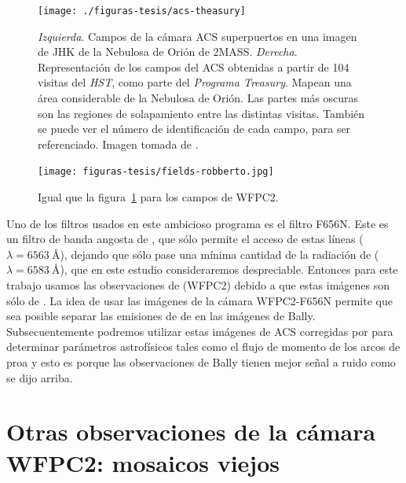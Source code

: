 \begin{figure}
\centering
  \texttt{[image: ./figuras-tesis/acs-theasury]}
\caption{\textit{Izquierda}. Campos de la cámara ACS superpuertos en una imagen de JHK de la Nebulosa de Orión de 2MASS. \textit{Derecha}. Representación de los campos del ACS obtenidas a partir de 104 visitas del \textit{HST}, como parte del \textit{Programa Treasury}. Mapean una área considerable de la Nebulosa de Orión. Las partes más oscuras son las regiones de solapamiento entre las distintas visitas. También se puede ver el número de identificación de cada campo, para ser referenciado. Imagen tomada de \citet{Robberto:2013a}. }\label{fig:field-acs-the}
\end{figure}

\begin{figure}
  \centering
  \texttt{[image: figuras-tesis/fields-robberto.jpg]}
  \caption{Igual que la figura~\ref{fig:field-acs-the} para los campos de WFPC2.}
  \label{fig:fields-robberto}
\end{figure}

Uno de los filtros usados en este ambicioso programa es el filtro F656N. Este es un filtro de banda angosta de \ha{}, que sólo permite el acceso de estas líneas (\ha{}~\(\lambda = 6563~\text{\AA{}}\)), dejando que sólo pase una mínima cantidad de la radiación de \nii{} (\(\lambda = 6583~\text{\AA{}}\)), que en este estudio consideraremos despreciable. Entonces para este trabajo usamos las observaciones de \citet{Robberto:2013a} (WFPC2) debido a que estas imágenes son sólo de \ha{}. La idea de usar las imágenes de la cámara WFPC2-F656N permite que sea posible separar las emisiones de \ha{} de \nii{} en las imágenes de Bally. Subsecuentemente  podremos  utilizar estas imágenes de ACS corregidas por \nii{} para determinar parámetros astrofísicos tales como el flujo de momento de los arcos de proa y esto es  porque las observaciones de Bally tienen mejor señal a ruido como se dijo arriba.

\section{Otras observaciones de la cámara WFPC2:  mosaicos viejos}
\label{sec:mosaic}

